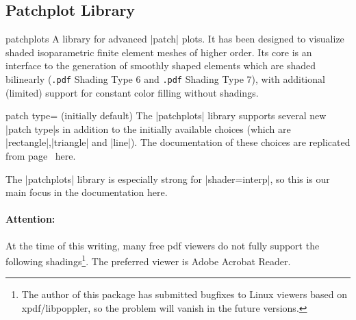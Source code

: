 \subsection{Patchplot Library}
\label{sec:lib:patchplots}
\begin{pgfplotslibrary}{patchplots}
	A library for advanced |patch| plots. It has been designed to visualize shaded isoparametric finite element meshes of higher order. Its core is an interface to the generation of smoothly shaped elements which are shaded bilinearly (\texttt{.pdf} Shading Type 6 and \texttt{.pdf} Shading Type 7), with additional (limited) support for constant color filling without shadings.

\begin{pgfplotskey}{patch type= (initially default)}
	The |patchplots| library supports several new |patch type|s in addition to the initially available choices (which are |rectangle|,|triangle| and |line|). The documentation of these choices are replicated from page~\pageref{key:patch:type} here.

	The |patchplots| library is especially strong for |shader=interp|, so this is our main focus in the documentation here.

	\paragraph{Attention:} At the time of this writing, many free pdf viewers do not fully support the following shadings\footnote{The author of this package has submitted bugfixes to Linux viewers based on xpdf/libpoppler, so the problem will vanish in the future versions.}. The preferred viewer is Adobe Acrobat Reader.


\end{pgfplotskey}
\end{pgfplotslibrary}
